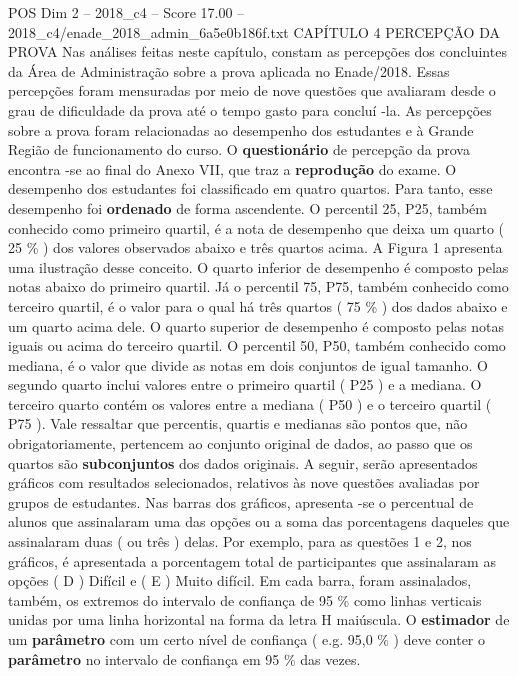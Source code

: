 \begin{textsample}{POS Dim 2 – 2018\_c4 – Score 17.00 – 2018\_c4/enade\_2018\_admin\_6a5e0b186f.txt}  \label{ex:f2_pos_052}
CAPÍTULO 4 PERCEPÇÃO DA PROVA Nas análises feitas neste capítulo, constam as percepções dos concluintes da Área de Administração sobre a prova aplicada no Enade/2018.
Essas percepções foram mensuradas por meio de nove questões que avaliaram desde o grau de dificuldade da prova até o tempo gasto para concluí -la.
As percepções sobre a prova foram relacionadas ao desempenho dos estudantes e à Grande Região de funcionamento do curso.
O \textbf{questionário} de percepção da prova encontra -se ao final do Anexo VII, que traz a \textbf{reprodução} do exame.
O desempenho dos estudantes foi classificado em quatro quartos.
Para tanto, esse desempenho foi \textbf{ordenado} de forma ascendente.
O percentil 25, P25, também conhecido como primeiro quartil, é a nota de desempenho que deixa um quarto ( 25 \% ) dos valores observados abaixo e três quartos acima.
A Figura 1 apresenta uma ilustração desse conceito.
O quarto inferior de desempenho é composto pelas notas abaixo do primeiro quartil.
Já o percentil 75, P75, também conhecido como terceiro quartil, é o valor para o qual há três quartos ( 75 \% ) dos dados abaixo e um quarto acima dele.
O quarto superior de desempenho é composto pelas notas iguais ou acima do terceiro quartil.
O percentil 50, P50, também conhecido como mediana, é o valor que divide as notas em dois conjuntos de igual tamanho.
O segundo quarto inclui valores entre o primeiro quartil ( P25 ) e a mediana.
O terceiro quarto contém os valores entre a mediana ( P50 ) e o terceiro quartil ( P75 ).
Vale ressaltar que percentis, quartis e medianas são pontos que, não obrigatoriamente, pertencem ao conjunto original de dados, ao passo que os quartos são \textbf{subconjuntos} dos dados originais.
A seguir, serão apresentados gráficos com resultados selecionados, relativos às nove questões avaliadas por grupos de estudantes.
Nas barras dos gráficos, apresenta -se o percentual de alunos que assinalaram uma das opções ou a soma das porcentagens daqueles que assinalaram duas ( ou três ) delas.
Por exemplo, para as questões 1 e 2, nos gráficos, é apresentada a porcentagem total de participantes que assinalaram as opções ( D ) Difícil e ( E ) Muito difícil.
Em cada barra, foram assinalados, também, os extremos do intervalo de confiança de 95 \% como linhas verticais unidas por uma linha horizontal na forma da letra H maiúscula.
O \textbf{estimador} de um \textbf{parâmetro} com um certo nível de confiança ( e.g. 95,0 \% ) deve conter o \textbf{parâmetro} no intervalo de confiança em 95 \% das vezes.

\end{textsample}
